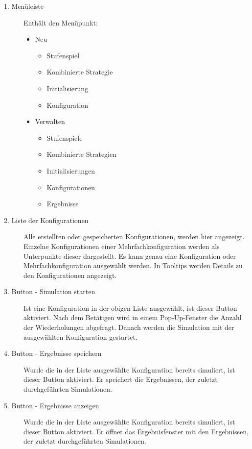 \begin{description}


\item[1. Menüleiste] Enthält den Menüpunkt:
	\begin{itemize}
		\item{Neu}
		\begin{itemize}
			\item{Stufenspiel}
			\item{Kombinierte Strategie}
			\item{Initialisierung}
			\item{Konfiguration}
		\end{itemize}
		\item{Verwalten}
		\begin{itemize}
			\item{Stufenspiele}
			\item{Kombinierte Strategien}
			\item{Initialisierungen}
			\item{Konfigurationen}
			\item{Ergebnisse}
		\end{itemize}
	\end{itemize}

\item[2. Liste der Konfigurationen] Alle erstellten oder gespeicherten Konfigurationen, werden hier angezeigt. Einzelne Konfigurationen einer Mehrfachkonfiguration werden als Unterpunkte dieser dargestellt. Es kann genau eine Konfiguration oder Mehrfachkonfiguration ausgewählt werden. In Tooltips werden Details zu den Konfigurationen angezeigt.

\item[3. Button - Simulation starten] Ist eine Konfiguration in der obigen Liste ausgewählt, ist dieser Button aktiviert. Nach dem Betätigen wird in einem Pop-Up-Fenster die Anzahl der Wiederholungen abgefragt. Danach werden die Simulation mit der ausgewählten Konfiguration gestartet.

\item[4. Button - Ergebnisse speichern] Wurde die in der Liste ausgewählte Konfiguration bereits simuliert, ist dieser Button aktiviert. Er speichert die Ergebnissen, der zuletzt durchgeführten Simulationen.

\item[5. Button - Ergebnisse anzeigen] Wurde die in der Liste ausgewählte Konfiguration bereits simuliert, ist dieser Button aktiviert. Er öffnet das Ergebnisfenster mit den Ergebnissen, der zuletzt durchgeführten Simulationen.



\end{description}

